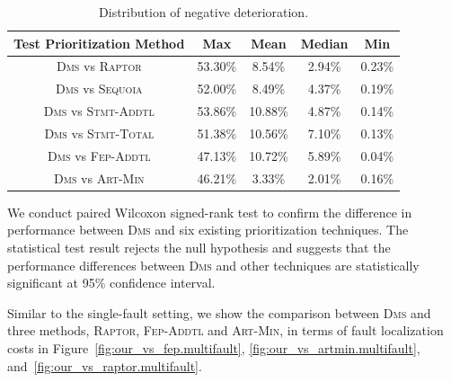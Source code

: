 \begin{table}[tbp]
    \centering
		\caption{Distribution of negative deterioration.}
		\renewcommand{\arraystretch}{1.5}
		\small
        \begin{tabular}{|c|c|c|c|c|}
			\hline
			Test Prioritization Method  &        Max &       Mean &     Median &        Min \\
			\hline\hline
			\textsc{Dms} vs \textsc{Raptor} & {  53.30\%} &     8.54\% &     2.94\% &     0.23\% \\
			\hline
			\textsc{Dms} vs \textsc{Sequoia} & {  52.00\%} &   8.49\% &     4.37\% &     0.19\% \\
			\hline
			\textsc{Dms} vs \textsc{Stmt-Addtl} & {  53.86\%} &    10.88\% &     4.87\% &     0.14\% \\
			\hline
			\textsc{Dms} vs \textsc{Stmt-Total} & { 51.38\%} &   10.56\% &   7.10\% &     0.13\% \\
			\hline
			\textsc{Dms} vs \textsc{Fep-Addtl} & {  47.13\%} &    10.72\% &     5.89\% &     0.04\% \\
			\hline
			\textsc{Dms} vs \textsc{Art-Min} & {  46.21\%} &     3.33\% &     2.01\% &     0.16\% \\
			\hline
		\end{tabular}
    \label{tab:compare_2_neg}
\end{table}

We conduct paired Wilcoxon signed-rank test to confirm the difference in performance between \textsc{Dms} and six existing prioritization techniques. The statistical test result rejects the null hypothesis and suggests that the performance differences between \textsc{Dms} and other techniques are statistically significant
at 95\% confidence interval.

\vspace{0.2cm}
Similar to the single-fault setting, 
we show the comparison between \textsc{Dms} and three methods, \textsc{Raptor}, \textsc{Fep-Addtl} and \textsc{Art-Min}, in terms of fault localization costs in Figure~\ref{fig:our_vs_fep.multifault}, \ref{fig:our_vs_artmin.multifault}, and~\ref{fig:our_vs_raptor.multifault}.

